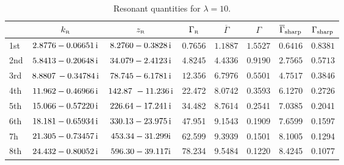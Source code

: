 \documentclass[12pt]{article}
\newcommand{\rmi}{{\rm i}}
\newcommand{\zr}{z_{\text{\tiny R}}}
\newcommand{\gr}{\Gamma _{\text{\tiny R}}}
\newcommand{\kr}{k_{\text{\tiny R}}}
\begin{document}
\vskip-0.3cm




\begin{table}[!h]
\centering
\vspace{6pt}
\begin{tabular}{|l| c| c| c| c | c | c | c|} %
\hline\hline
      & $\kr$ & $\zr$ & $\gr$ & $\overline{\Gamma}$ & $\Gamma$ & 
$\overline{\Gamma}_{\rm sharp}$
& $\Gamma_{\rm sharp}$  \\
\hline
1st &  $2.8776 -0.06651 \, \rmi$  & $8.2760 -0.3828\, \rmi$ & 
$0.7656$  & $1.1887$ & $1.5527$ & $0.6416$ & $0.8381$ \\



2nd & $5.8413 -0.20648\, \rmi$ & $34.079 -2.4123\, \rmi$ & 
$4.8245$ & $4.4336$ & $0.9190$ & $2.7565$ & $0.5713$ \\


3rd & $8.8807\, -0.34784\, \rmi$ & $78.745-6.1781\, \rmi$ & 
$12.356$ & $6.7976$ & $0.5501$ & $4.7517$ & $0.3846$  \\

4th & $11.962 -0.46966\, \rmi$ & $142.87\ -11.236\, \rmi$ & 
22.472 & 8.0742 & 0.3593 & 6.1270 & 0.2726  \\

5th & $15.066 -0.57220\, \rmi$ & $226.64 -17.241\, \rmi$ & 
34.482 & 8.7614 & 0.2541 & 7.0385 & 0.2041  \\

6th & $18.181 -0.65934 \, \rmi$ & $330.13 -23.975\, \rmi$ & 
47.951 & 9.1543 & 0.1909 & 7.6599 & 0.1597  \\

7h & $21.305 -0.73457\, \rmi$ & $453.34 -31.299 \rmi$ & 
62.599 & 9.3939 & 0.1501 & 8.1005 & 0.1294  \\

8th & $24.432 -0.80052\, \rmi$ & $596.30 -39.117 \rmi$ & 
78.234 & 9.5484 & 0.1220 & 8.4245 & 0.1077  \\

\hline\hline 
\end{tabular}
\caption{Resonant quantities for $\lambda =10$.}
\label{table:10}
\end{table}



\vskip-0.3cm


\end{document}

